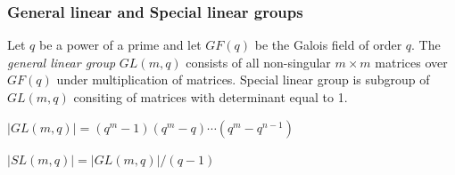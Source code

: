 \documentclass{beamer}
\begin{document}
\begin{frame}
	\frametitle{General linear and Special linear groups}
		\begin{definition} Let $q$ be a power of a prime and let $GF(q)$ be the Galois field of order $q$. The {\em general linear group} $GL(m,q)$ consists of all non-singular $m\times m$ matrices over $GF(q)$ under multiplication of matrices.
		Special linear group is subgroup of $GL(m,q)$ consiting of matrices with determinant equal to 1.
		\end{definition}
		\begin{theorem}[Order of $GL(m,q)$]
			$|GL(m,q)| = (q^m - 1)(q^m - q) \cdots (q^m - q^{n-1})$
		\end{theorem}
		\begin{theorem}[Order of $SL(m,q)$]
			$|SL(m,q)| = |GL(m,q)|/(q-1)$
		\end{theorem}
\end{frame}
\end{document}
